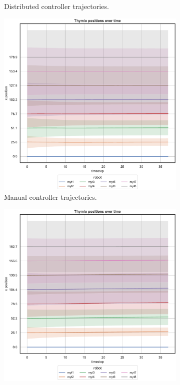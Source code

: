 \begin{figure}[!htb]
\begin{center}
\begin{subfigure}[h]{0.49\textwidth}
			\caption{Distributed controller trajectories.}
		\end{subfigure}
	\end{center}
	\begin{center}
		\begin{subfigure}[h]{0.49\textwidth}
			\centering			
			\includegraphics[width=.9\textwidth]{contents/images/net-d15/position-overtime-manual}%
			\caption{Manual controller trajectories.}
		\end{subfigure}
		\hfill
		\begin{subfigure}[h]{0.49\textwidth}
			\centering
			\includegraphics[width=.9\textwidth]{contents/images/net-d15/position-overtime-learned_distributed}

\end{subfigure}
\end{center}
\end{figure}
